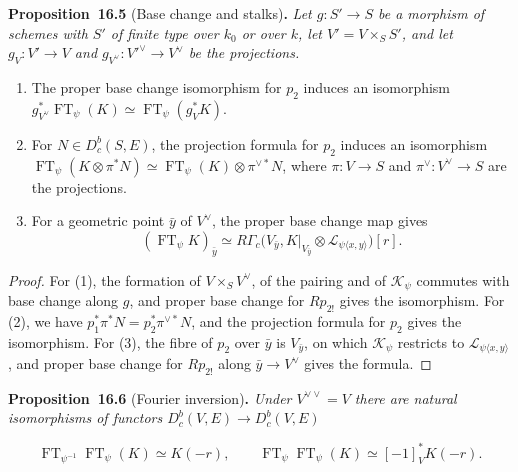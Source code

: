 \documentclass[11pt]{article}
\newenvironment{bpstatement}[2]{\par\addvspace{0.6\baselineskip}\noindent\textbf{#1}#2\textbf{.}\enspace\ignorespaces}
  {\par\addvspace{0.4\baselineskip}}
\newenvironment{bpstatementit}[2]{\begin{bpstatement}{#1}{#2}\itshape\ignorespaces}{\end{bpstatement}}
\providecommand{\Dbc}{}\renewcommand{\Dbc}{D^b_c}
\begin{document}
\label{bp17}%
\begin{bpstatementit}{Proposition~16.5}{ (Base change and stalks)}
Let \(g:S'\to S\) be a morphism of schemes with \(S'\) of finite type over \(k_0\) or over \(k\), let \(V'=V\times_SS'\), and let \(g_V:V'\to V\) and \(g_{V^\vee}:V'^\vee\to V^\vee\) be the projections.

\begin{enumerate}
\item The proper base change isomorphism for \(p_2\) induces an isomorphism \(g_{V^\vee}^*\operatorname{FT}_\psi(K)\simeq
  \operatorname{FT}_\psi(g_V^*K)\).
\item For \(N\in\Dbc(S,E)\), the projection formula for \(p_2\) induces an isomorphism \(\operatorname{FT}_\psi(K\otimes\pi^*N)\simeq
  \operatorname{FT}_\psi(K)\otimes\pi^{\vee*}N\), where \(\pi:V\to S\) and \(\pi^\vee:V^\vee\to S\) are the projections.
\item For a geometric point \(\bar y\) of \(V^\vee\), the proper base change map gives \[
   (\operatorname{FT}_\psi K)_{\bar y}
   \simeq
   R\Gamma_c\bigl(V_{\bar y},
   K|_{V_{\bar y}}\otimes
   \mathcal L_{\psi\langle x,y\rangle}\bigr)[r].
   \tag{16.2}
   \]
\end{enumerate}
\end{bpstatementit}

\begin{proof}[{Proof}]\label{bp18}%
For (1), the formation of \(V\times_SV^\vee\), of the pairing and of \(\mathcal K_\psi\) commutes with base change along \(g\), and proper base change for \(Rp_{2!}\) gives the isomorphism. For (2), we have \(p_1^*\pi^*N=p_2^*\pi^{\vee*}N\), and the projection formula for \(p_2\) gives the isomorphism. For (3), the fibre of \(p_2\) over \(\bar y\) is \(V_{\bar y}\), on which \(\mathcal K_\psi\) restricts to \(\mathcal L_{\psi\langle x,y\rangle}\), and proper base change for \(Rp_{2!}\) along \(\bar y\to V^\vee\) gives the formula.
\end{proof}

\label{bp19}%
\begin{bpstatementit}{Proposition~16.6}{ (Fourier inversion)}
Under \(V^{\vee\vee}=V\) there are natural isomorphisms of functors \(\Dbc(V,E)\to\Dbc(V,E)\)

\[
\operatorname{FT}_{\psi^{-1}}\operatorname{FT}_\psi(K)
\simeq K(-r),
\qquad
\operatorname{FT}_{\psi}\operatorname{FT}_\psi(K)
\simeq [-1]_V^*K(-r).
\]
\end{bpstatementit}
\end{document}
